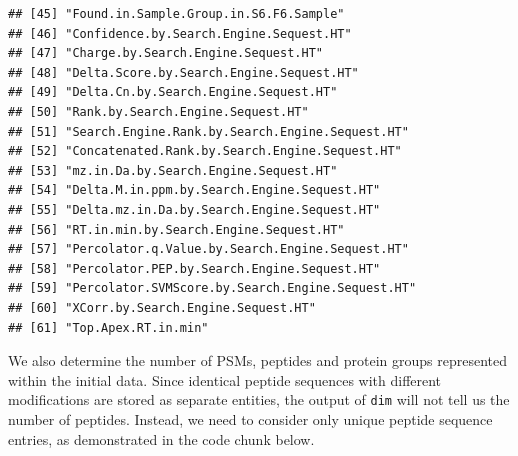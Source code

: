 \documentclass[9pt,a4paper,]{extarticle}
\begin{document}
\begin{verbatim}
## [45] "Found.in.Sample.Group.in.S6.F6.Sample"          
## [46] "Confidence.by.Search.Engine.Sequest.HT"         
## [47] "Charge.by.Search.Engine.Sequest.HT"             
## [48] "Delta.Score.by.Search.Engine.Sequest.HT"        
## [49] "Delta.Cn.by.Search.Engine.Sequest.HT"           
## [50] "Rank.by.Search.Engine.Sequest.HT"               
## [51] "Search.Engine.Rank.by.Search.Engine.Sequest.HT" 
## [52] "Concatenated.Rank.by.Search.Engine.Sequest.HT"  
## [53] "mz.in.Da.by.Search.Engine.Sequest.HT"           
## [54] "Delta.M.in.ppm.by.Search.Engine.Sequest.HT"     
## [55] "Delta.mz.in.Da.by.Search.Engine.Sequest.HT"     
## [56] "RT.in.min.by.Search.Engine.Sequest.HT"          
## [57] "Percolator.q.Value.by.Search.Engine.Sequest.HT" 
## [58] "Percolator.PEP.by.Search.Engine.Sequest.HT"     
## [59] "Percolator.SVMScore.by.Search.Engine.Sequest.HT"
## [60] "XCorr.by.Search.Engine.Sequest.HT"              
## [61] "Top.Apex.RT.in.min"
\end{verbatim}

We also determine the number of PSMs, peptides and protein groups represented within
the initial data. Since identical peptide sequences with different modifications
are stored as separate entities, the output of \texttt{dim} will not tell us the number
of peptides. Instead, we need to consider only unique peptide sequence entries,
as demonstrated in the code chunk below.
\end{document}
